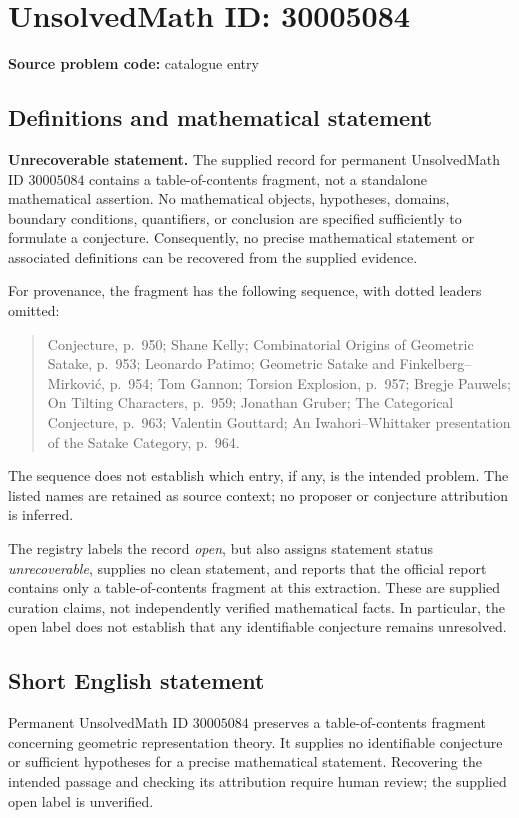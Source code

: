 \documentclass[11pt]{article}
\begin{document}
\section*{UnsolvedMath ID: 30005084}
\textbf{Source problem code:} catalogue entry
\subsection{Definitions and mathematical statement}
\textbf{Unrecoverable statement.} The supplied record for permanent UnsolvedMath ID \(30005084\) contains a table-of-contents fragment, not a standalone mathematical assertion. No mathematical objects, hypotheses, domains, boundary conditions, quantifiers, or conclusion are specified sufficiently to formulate a conjecture. Consequently, no precise mathematical statement or associated definitions can be recovered from the supplied evidence.

For provenance, the fragment has the following sequence, with dotted leaders omitted:
\begin{quote}
Conjecture, p.~950; Shane Kelly; Combinatorial Origins of Geometric Satake, p.~953; Leonardo Patimo; Geometric Satake and Finkelberg--Mirković, p.~954; Tom Gannon; Torsion Explosion, p.~957; Bregje Pauwels; On Tilting Characters, p.~959; Jonathan Gruber; The Categorical Conjecture, p.~963; Valentin Gouttard; An Iwahori--Whittaker presentation of the Satake Category, p.~964.
\end{quote}
The sequence does not establish which entry, if any, is the intended problem. The listed names are retained as source context; no proposer or conjecture attribution is inferred.

The registry labels the record \emph{open}, but also assigns statement status \emph{unrecoverable}, supplies no clean statement, and reports that the official report contains only a table-of-contents fragment at this extraction. These are supplied curation claims, not independently verified mathematical facts. In particular, the open label does not establish that any identifiable conjecture remains unresolved.
\subsection{Short English statement}
Permanent UnsolvedMath ID \(30005084\) preserves a table-of-contents fragment concerning geometric representation theory. It supplies no identifiable conjecture or sufficient hypotheses for a precise mathematical statement. Recovering the intended passage and checking its attribution require human review; the supplied open label is unverified.
\end{document}
